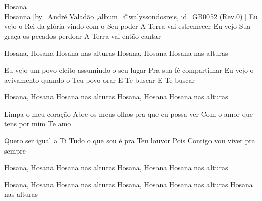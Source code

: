 \beginsong
{Hosana \\Hosanna %
}[by={André Valadão %
},album={@walyssondosreis},
id={GB0052 %
(Rev.0) %
}]
Eu vejo o Rei da glória vindo com o Seu poder
A Terra vai estremecer
Eu vejo Sua graça os pecados perdoar
A Terra vai então cantar

Hosana, Hosana
Hosana nas alturas
Hosana, Hosana
Hosana nas alturas

Eu vejo um povo eleito assumindo o seu lugar
Pra sua fé compartilhar
Eu vejo o avivamento quando o Teu povo orar
E Te buscar
E Te buscar

Hosana, Hosana
Hosana nas alturas
Hosana, Hosana
Hosana nas alturas

Limpa o meu coração
Abre os meus olhos pra que eu possa ver
Com o amor que tens por mim
Te amo

Quero ser igual a Ti
Tudo o que sou é pra Teu louvor
Pois Contigo vou viver pra sempre

Hosana, Hosana
Hosana nas alturas
Hosana, Hosana
Hosana nas alturas

Hosana, Hosana
Hosana nas alturas
Hosana, Hosana
Hosana nas alturas
Hosana nas alturas


